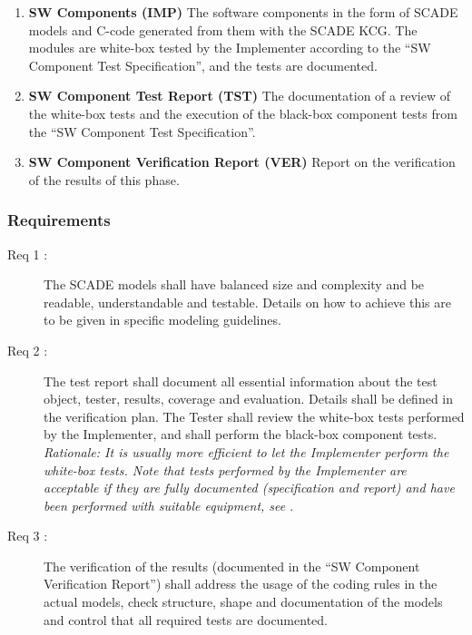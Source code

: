 \documentclass{template/openetcs_article}
\begin{document}
\begin{enumerate}
\item \textbf{SW Components (IMP)} The software components in the form
  of SCADE models and C-code generated from them with the SCADE
  KCG. The modules are white-box tested by the Implementer according
  to the ``SW Component Test Specification'', and the tests are
  documented.
\item \textbf{SW Component Test Report (TST)} The documentation of a
  review of the white-box tests and the execution of the black-box
  component tests from the ``SW Component Test Specification''.
\item \textbf{SW Component Verification Report (VER)} Report on the
  verification of the results of this phase.
\end{enumerate}

\subsubsection{Requirements}
\label{sec:5-requirements}

\begin{description}
\item[Req 1 {\cite[7.5.4.1 to 7.4.3.4]{EN50128:2011}}:] The SCADE
  models shall have balanced size and complexity and be readable,
  understandable and testable. Details on how to achieve this are to
  be given in specific modeling guidelines.
\item[Req 2 {\cite[6.1.4.5, 7.4.3.7]{EN50128:2011}}:] The test report
  shall document all essential information about the test object,
  tester, results, coverage and evaluation. Details shall be defined
  in the verification plan. The Tester shall review the white-box
  tests performed by the Implementer, and shall perform the black-box
  component tests. \emph{Rationale: It is usually more efficient to
    let the Implementer perform the white-box tests. Note that tests
    performed by the Implementer are acceptable if they are fully
    documented (specification and report) and have been performed with
    suitable equipment, see \cite[6.1.4.1 to 6.1.4.5]{EN50128:2011}}.
\item[Req 3 {\cite[7.5.4.8 to 7.4.4.10]{EN50128:2011}}:] The
  verification of the results (documented in the ``SW Component
  Verification Report'') shall address the usage of the coding rules in
  the actual models, check structure, shape and documentation of the
  models and control that all required tests are documented.
\end{description}
\end{document}
